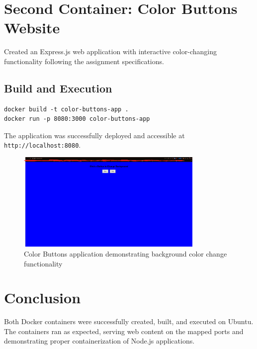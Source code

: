 \section{Second Container: Color Buttons Website}
Created an Express.js web application with interactive color-changing functionality following the assignment specifications.

\subsection{Build and Execution}
\begin{verbatim}
docker build -t color-buttons-app .
docker run -p 8080:3000 color-buttons-app
\end{verbatim}

The application was successfully deployed and accessible at \texttt{http://localhost:8080}.

\begin{figure}[H]
    \centering
    \includegraphics[width=0.8\textwidth]{png/Screenshot 2025-09-23 193125.png}
    \caption{Color Buttons application demonstrating background color change functionality}
    \label{fig:color-buttons}
\end{figure}

\section{Conclusion}
Both Docker containers were successfully created, built, and executed on Ubuntu. The containers ran as expected, serving web content on the mapped ports and demonstrating proper containerization of Node.js applications.
